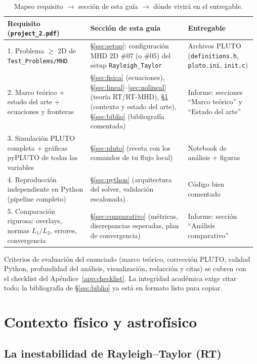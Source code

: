 \documentclass[11pt,a4paper]{article}
\newcommand{\code}[1]{\texttt{#1}}
\begin{document}
\begin{table}[htbp]
\centering\small
\caption{Mapeo requisito $\to$ sección de esta guía $\to$ dónde vivirá en el entregable.}
\begin{tabular}{@{}p{5.1cm}p{4.8cm}p{4.9cm}@{}}
\toprule
Requisito (\code{project\_2.pdf}) & Sección de esta guía & Entregable \\
\midrule
1. Problema $\ge$ 2D de \code{Test\_Problems/MHD} & \S\ref{sec:setup}: configuración MHD 2D \#07 (o \#05) del setup \code{Rayleigh\_Taylor} & Archivos PLUTO (\code{definitions.h}, \code{pluto.ini}, \code{init.c}) \\
2. Marco teórico + estado del arte + ecuaciones y fronteras & \S\ref{sec:fisica} (ecuaciones), \S\ref{sec:lineal}--\ref{sec:nolineal} (teoría RT/RT-MHD), \S\ref{sec:contexto} (contexto y estado del arte), \S\ref{sec:biblio} (bibliografía comentada) & Informe: secciones ``Marco teórico'' y ``Estado del arte'' \\
3. Simulación PLUTO completa + gráficas pyPLUTO de todas las variables & \S\ref{sec:pluto} (receta con los comandos de tu flujo local) & Notebook de análisis + figuras \\
4. Reproducción independiente en Python (pipeline completo) & \S\ref{sec:python} (arquitectura del solver, validación escalonada) & Código bien comentado \\
5. Comparación rigurosa: overlays, normas $L_1/L_2$, errores, convergencia & \S\ref{sec:comparativo} (métricas, discrepancias esperadas, plan de convergencia) & Informe: sección ``Análisis comparativo'' \\
\bottomrule
\end{tabular}
\end{table}

Criterios de evaluación del enunciado (marco teórico, corrección PLUTO, calidad Python,
profundidad del análisis, visualización, redacción y citas) se cubren con el checklist del
Apéndice~\ref{app:checklist}. La integridad académica exige citar todo; la bibliografía de
\S\ref{sec:biblio} ya está en formato listo para copiar.

\section{Contexto físico y astrofísico}
\label{sec:contexto}

\subsection{La inestabilidad de Rayleigh--Taylor (RT)}
\end{document}
